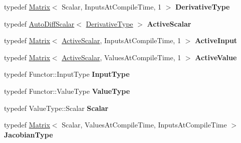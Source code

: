 \begin{DoxyCompactItemize}
typedef \hyperlink{group___core___module_class_eigen_1_1_matrix}{Matrix}$<$ Scalar, Inputs\+At\+Compile\+Time, 1 $>$ {\bfseries Derivative\+Type}
\item 
\mbox{\label{class_eigen_1_1_auto_diff_jacobian_aa06772173c0ca9e1357c45f3119e1e05}} 
typedef \hyperlink{class_eigen_1_1_auto_diff_scalar}{Auto\+Diff\+Scalar}$<$ \hyperlink{group___core___module_class_eigen_1_1_matrix}{Derivative\+Type} $>$ {\bfseries Active\+Scalar}
\item 
\mbox{\label{class_eigen_1_1_auto_diff_jacobian_aeb988484a6e31fa78c963912a2eba925}} 
typedef \hyperlink{group___core___module_class_eigen_1_1_matrix}{Matrix}$<$ \hyperlink{class_eigen_1_1_auto_diff_scalar}{Active\+Scalar}, Inputs\+At\+Compile\+Time, 1 $>$ {\bfseries Active\+Input}
\item 
\mbox{\label{class_eigen_1_1_auto_diff_jacobian_ad9142ab47c010bd49a572dbf82ebbf8e}} 
typedef \hyperlink{group___core___module_class_eigen_1_1_matrix}{Matrix}$<$ \hyperlink{class_eigen_1_1_auto_diff_scalar}{Active\+Scalar}, Values\+At\+Compile\+Time, 1 $>$ {\bfseries Active\+Value}
\item 
\mbox{\label{class_eigen_1_1_auto_diff_jacobian_a25e2937641e16ba80edcf48a12b16b9c}} 
typedef Functor\+::\+Input\+Type {\bfseries Input\+Type}
\item 
\mbox{\label{class_eigen_1_1_auto_diff_jacobian_a6a4ed984810a6561e7f89e885ceeb6aa}} 
typedef Functor\+::\+Value\+Type {\bfseries Value\+Type}
\item 
\mbox{\label{class_eigen_1_1_auto_diff_jacobian_a5d223badd23a9e5985965eff26a2fa6b}} 
typedef Value\+Type\+::\+Scalar {\bfseries Scalar}
\item 
\mbox{\label{class_eigen_1_1_auto_diff_jacobian_acd5c9daf8db336d70ad61cc75e62af22}} 
typedef \hyperlink{group___core___module_class_eigen_1_1_matrix}{Matrix}$<$ Scalar, Values\+At\+Compile\+Time, Inputs\+At\+Compile\+Time $>$ {\bfseries Jacobian\+Type}
\item 

\end{DoxyCompactItemize}
